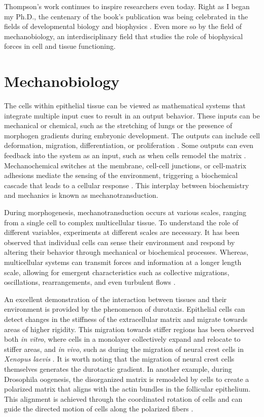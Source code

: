 Thompson's work continues to inspire researchers even today. Right as I began my Ph.D., the centenary of the book's publication was being celebrated in the fields of developmental biology and biophysics \cite{heer2017, nat2017, natphys2017}. Even more so by the field of mechanobiology, an interdisciplinary field that studies the role of biophysical forces in cell and tissue functioning. 

\hypertarget{mechanobiology}{%
\section{Mechanobiology}\label{mechanobiology}}

The cells within epithelial tissue can be viewed as mathematical systems that integrate multiple input cues to result in an output behavior. These inputs can be mechanical or chemical, such as the stretching of lungs or the presence of morphogen gradients during embryonic development. The outputs can include cell deformation, migration, differentiation, or proliferation \cite{kumar2017}. Some outputs can even feedback into the system as an input, such as when cells remodel the matrix \cite{malandrino2018}. Mechanochemical switches at the membrane, cell-cell junctions, or cell-matrix adhesions mediate the sensing of the environment, triggering a biochemical cascade that leads to a cellular response \cite{roca-cusachs2017}. This interplay between biochemistry and mechanics is known as mechanotransduction.

During morphogenesis, mechanotransduction occurs at various scales, ranging from a single cell to complex multicellular tissue. To understand the role of different variables, experiments at different scales are necessary. It has been observed that individual cells can sense their environment and respond by altering their behavior through mechanical or biochemical processes. Whereas, multicellular systems can transmit forces and information at a longer length scale, allowing for emergent characteristics such as collective migrations, oscillations, rearrangements, and even turbulent flows \cite{heer2017, lecuit2011,trepat2018}.

An excellent demonstration of the interaction between tissues and their environment is provided by the phenomenon of durotaxis. Epithelial cells can detect changes in the stiffness of the extracellular matrix and migrate towards areas of higher rigidity. This migration towards stiffer regions has been observed both \textit{in vitro}, where cells in a monolayer collectively expand and relocate to stiffer areas, and \textit{in vivo}, such as during the migration of neural crest cells in \textit{Xenopus laevis} \cite{sunyer2016, shellard2021}. It is worth noting that the migration of neural crest cells themselves generates the durotactic gradient. In another example, during Drosophila oogenesis, the disorganized matrix is remodeled by cells to create a polarized matrix that aligns with the actin bundles in the follicular epithelium. This alignment is achieved through the coordinated rotation of cells and can guide the directed motion of cells along the polarized fibers \cite{haigo2011, cetera2014}.

